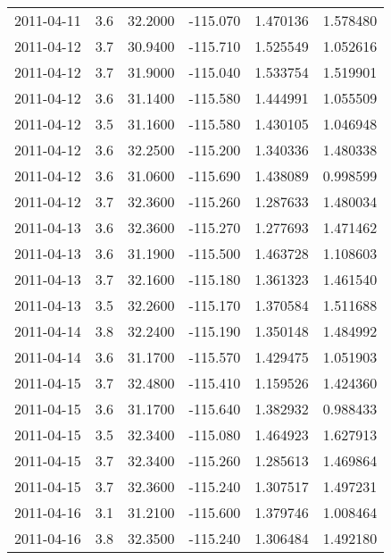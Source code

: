 \begin{tabular}{lrrrrr}
2011-04-11 &       3.6 &  32.2000 &  -115.070 &         1.470136 &         1.578480 \\
2011-04-12 &       3.7 &  30.9400 &  -115.710 &         1.525549 &         1.052616 \\
2011-04-12 &       3.7 &  31.9000 &  -115.040 &         1.533754 &         1.519901 \\
2011-04-12 &       3.6 &  31.1400 &  -115.580 &         1.444991 &         1.055509 \\
2011-04-12 &       3.5 &  31.1600 &  -115.580 &         1.430105 &         1.046948 \\
2011-04-12 &       3.6 &  32.2500 &  -115.200 &         1.340336 &         1.480338 \\
2011-04-12 &       3.6 &  31.0600 &  -115.690 &         1.438089 &         0.998599 \\
2011-04-12 &       3.7 &  32.3600 &  -115.260 &         1.287633 &         1.480034 \\
2011-04-13 &       3.6 &  32.3600 &  -115.270 &         1.277693 &         1.471462 \\
2011-04-13 &       3.6 &  31.1900 &  -115.500 &         1.463728 &         1.108603 \\
2011-04-13 &       3.7 &  32.1600 &  -115.180 &         1.361323 &         1.461540 \\
2011-04-13 &       3.5 &  32.2600 &  -115.170 &         1.370584 &         1.511688 \\
2011-04-14 &       3.8 &  32.2400 &  -115.190 &         1.350148 &         1.484992 \\
2011-04-14 &       3.6 &  31.1700 &  -115.570 &         1.429475 &         1.051903 \\
2011-04-15 &       3.7 &  32.4800 &  -115.410 &         1.159526 &         1.424360 \\
2011-04-15 &       3.6 &  31.1700 &  -115.640 &         1.382932 &         0.988433 \\
2011-04-15 &       3.5 &  32.3400 &  -115.080 &         1.464923 &         1.627913 \\
2011-04-15 &       3.7 &  32.3400 &  -115.260 &         1.285613 &         1.469864 \\
2011-04-15 &       3.7 &  32.3600 &  -115.240 &         1.307517 &         1.497231 \\
2011-04-16 &       3.1 &  31.2100 &  -115.600 &         1.379746 &         1.008464 \\
2011-04-16 &       3.8 &  32.3500 &  -115.240 &         1.306484 &         1.492180 \\

\end{tabular}
